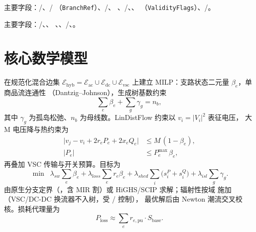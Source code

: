 \documentclass[UTF8,fontset=fandol,a4paper,11pt]{ctexart}
\begin{document}
主要字段：/、/
（\texttt{BranchRef}）、/、
、/、、
（\texttt{ValidityFlags}）、/。

主要字段：/、、
、、/、。

\section{核心数学模型}
在规范化混合边集 $\mathcal{E}_{\text{hyb}}=\mathcal{E}_{\text{ac}}\cup\mathcal{E}_{\text{dc}}
\cup\mathcal{E}_{\text{vsc}}$ 上建立 MILP：支路状态二元量 $\beta_e$，单商品流连通性
（Dantzig--Johnson），生成树基数约束
\begin{equation}
\sum_{e}\beta_e + \sum_{g}\gamma_g = n_b,
\end{equation}
其中 $\gamma_g$ 为孤岛松弛、$n_b$ 为母线数。LinDistFlow 约束以 $v_i=|V_i|^2$ 表征电压，
大 M 电压降与热约束为
\begin{align}
\bigl\lvert v_j - v_i + 2 r_e P_e + 2 x_e Q_e \bigr\rvert &\le M\,(1-\beta_e), \\
\lvert P_e \rvert &\le P_e^{\max}\,\beta_e,
\end{align}
再叠加 VSC 传输与开关预算。目标为
\begin{equation}
\min\;\; \lambda_{sw}\sum_e \beta_e
       + \lambda_{loss}\sum_e r_e \beta_e
       + \lambda_{shed}\sum_i \bigl(s_i^{P}+s_i^{Q}\bigr)
       + \lambda_{isl}\sum_g \gamma_g .
\end{equation}
由原生分支定界（，含 MIR 割）或 HiGHS/SCIP 求解；辐射性按域
施加（VSC/DC-DC 换流器不入树，受 / 控制），
最优解后由 Newton 潮流交叉校核。损耗代理量为
\begin{equation}
P_{\text{loss}} \approx \sum_e r_{e,\text{pu}}\cdot S_{\text{base}} .
\end{equation}
\end{document}
